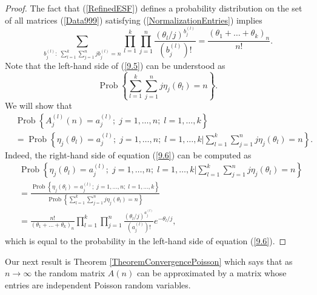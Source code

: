 \documentclass[12pt]{amsart}
\theoremstyle{definition}
\numberwithin{equation}{section}
\DeclareMathOperator{\Prob}{Prob}
\begin{document}
\begin{proof}
The fact that (\ref{RefinedESF}) defines a probability distribution on the set of all matrices (\ref{Data999})
satisfying (\ref{NormalizationEntries}) implies
\begin{equation}\label{9.5}
\sum\limits_{b_j^{(l)}:\;\sum\limits_{l=1}^k\sum\limits_{j=1}^njb_j^{(l)}=n}
\prod_{l=1}^{k}\prod\limits_{j=1}^n\frac{\left(\theta_l/j\right)^{b_j^{(l)}}}{(b_j^{(l)})!}=
\frac{\left(\theta_1+\ldots+\theta_k\right)_n}{n!}.
\end{equation}
Note that the left-hand side of (\ref{9.5}) can be understood as
$$
\Prob\left\{\sum\limits_{l=1}^k\sum\limits_{j=1}^nj\eta_j(\theta_l)=n\right\}.
$$
We will show that
\begin{equation}\label{9.6}
\begin{split}
&\Prob\left\{A_j^{(l)}(n)=a_j^{(l)};\; j=1,\ldots,n;\; l=1,\ldots,k\right\}\\
&=
\Prob\left\{\eta_j(\theta_l)=a_j^{(l)};\; j=1,\ldots,n;\;l=1,\ldots,k\biggl\vert
\sum\limits_{l=1}^k\sum\limits_{j=1}^nj\eta_j(\theta_l)=n\right\}.
\end{split}
\end{equation}
Indeed, the right-hand  side of equation (\ref{9.6}) can be computed as
\begin{equation}\label{9.7}
\begin{split}
&
\Prob\left\{\eta_j(\theta_l)=a_j^{(l)};\; j=1,\ldots,n;\;l=1,\ldots,k\biggl\vert
\sum\limits_{l=1}^k\sum\limits_{j=1}^nj\eta_j(\theta_l)=n\right\}\\
&=\frac{\Prob\left\{\eta_j(\theta_l)=a_j^{(l)};\;j=1,\ldots,n;\;l=1,\ldots,k\right\}}{\Prob\left\{\sum\limits_{l=1}^k\sum\limits_{j=1}^nj\eta_j(\theta_l)=n\right\}}\\
&=\frac{n!}{\left(\theta_1+\ldots+\theta_k\right)_n}
\prod\limits_{l=1}^k\prod\limits_{j=1}^n\frac{\left(\theta_l/j\right)^{a_j^{(l)}}}{\left(a_j^{(l)}\right)!}e^{-\theta_l/j},
\end{split}
\end{equation}
which is equal to the probability in the left-hand side of equation (\ref{9.6}).
\end{proof}
Our next result is Theorem \ref{TheoremConvergencePoisson} which says that as $n\rightarrow\infty$ the random matrix $A(n)$ can be approximated by a matrix whose entries are independent Poisson random variables.
\end{document}

